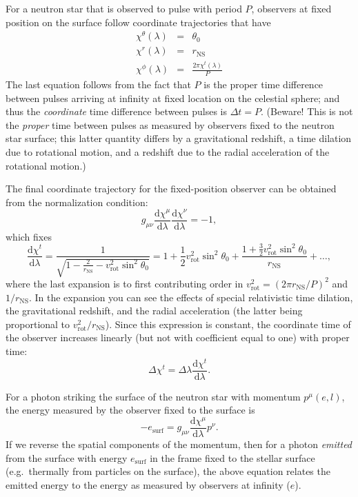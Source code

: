 \documentclass[modern]{aastex631}
\newcommand{\dd}{\mathrm{d}}
\newcommand{\rNS}{r_\mathrm{NS}}
\newcommand{\vRot}{v_\mathrm{rot}}
\begin{document}
For a neutron star that is observed to pulse with period $P$, observers at fixed
position on the surface follow coordinate trajectories that have 
\begin{eqnarray}
    \chi^\theta\left( \lambda \right) & = & \theta_0 \\
    \chi^r\left( \lambda \right) & = & \rNS \\
    \chi^\phi\left(\lambda \right) & = & \frac{2 \pi \chi^t\left(\lambda \right)}{P}
\end{eqnarray}
The last equation follows from the fact that $P$ is the proper time difference
between pulses arriving at infinity at fixed location on the celestial sphere;
and thus the \emph{coordinate} time difference between pulses is $\Delta t = P$.
(Beware!  This is not the \emph{proper} time between pulses as measured by
observers fixed to the neutron star surface; this latter quantity differs by a
gravitational redshift, a time dilation due to rotational motion, and a redshift
due to the radial acceleration of the rotational motion.)

The final coordinate trajectory for the fixed-position observer can be obtained
from the normalization condition:
\begin{equation}
    g_{\mu\nu} \frac{\dd \chi^\mu}{\dd \lambda} \frac{\dd \chi^\nu}{\dd \lambda} = -1,
\end{equation}
which fixes 
\begin{equation}
    \frac{\dd \chi^t}{\dd \lambda} = \frac{1}{\sqrt{1 - \frac{2}{\rNS} - \vRot^2 \sin^2 \theta_0}} = 1 + \frac{1}{2}  \vRot^2 \sin^2 \theta_0 + \frac{1 + \frac{3}{2} \vRot^2 \sin^2 \theta_0}{\rNS} + \ldots,
\end{equation}
where the last expansion is to first contributing order in $\vRot^2 = \left( 2
\pi \rNS / P \right)^2$ and $1/\rNS$.  In the expansion you can see the effects
of special relativistic time dilation, the gravitational redshift, and the
radial acceleration (the latter being proportional to $\vRot^2 / \rNS$).  Since
this expression is constant, the coordinate time of the observer increases
linearly (but not with coefficient equal to one) with proper time:
\begin{equation}
    \Delta \chi^t = \Delta \lambda \frac{\dd \chi^t}{\dd \lambda}.
\end{equation}

For a photon striking the surface of the neutron star with momentum $p^\mu\left(
e, l \right)$, the energy measured by the observer fixed to the surface is 
\begin{equation}
    -e_\mathrm{surf} = g_{\mu\nu} \frac{\dd \chi^\mu}{\dd \lambda} p^\nu.
\end{equation}
If we reverse the spatial components of the momentum, then for a photon
\emph{emitted} from the surface with energy $e_\mathrm{surf}$ in the frame fixed
to the stellar surface (e.g.\ thermally from particles on the surface), the
above equation relates the emitted energy to the energy as measured by observers
at infinity ($e$).
\end{document}

